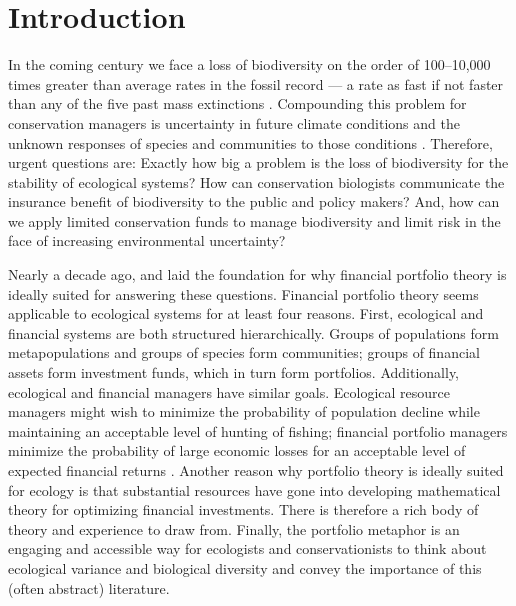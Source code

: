 \chapter[Introduction]{Introduction}

In the coming century we face a loss of biodiversity on the order of 100--10,000 times greater than average rates in the fossil record \citep{mea2005} --- a rate as fast if not faster than any of the five past mass extinctions \citep{barnosky2011, harnik2012}. Compounding this problem for conservation managers is uncertainty in future climate conditions \citep{heller2009} and the unknown responses of species and communities to those conditions \citep{lavergne2010}. Therefore, urgent questions are: Exactly how big a problem is the loss of biodiversity for the stability of ecological systems? How can conservation biologists communicate the insurance benefit of biodiversity to the public and policy makers? And, how can we apply limited conservation funds to manage biodiversity and limit risk in the face of increasing environmental uncertainty?

Nearly a decade ago, \citet{figge2004} and \citet{koellner2006} laid the foundation for why financial portfolio theory is ideally suited for answering these questions. Financial portfolio theory seems applicable to ecological systems for at least four reasons. First, ecological and financial systems are both structured hierarchically. Groups of populations form metapopulations and groups of species form communities; groups of financial assets form investment funds, which in turn form portfolios. Additionally, ecological and financial managers have similar goals. Ecological resource managers might wish to minimize the probability of population decline while maintaining an acceptable level of hunting of fishing; financial portfolio managers minimize the probability of large economic losses for an acceptable level of expected financial returns \citep{may2008}. Another reason why portfolio theory is ideally suited for ecology is that substantial resources have gone into developing mathematical theory for optimizing financial investments. There is therefore a rich body of theory and experience to draw from. Finally, the portfolio metaphor is an engaging and accessible way for ecologists and conservationists to think about ecological variance and biological diversity and convey the importance of this (often abstract) literature.

